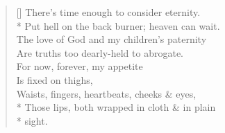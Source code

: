 \begin{verse}[\versewidth]
    There's time enough to consider eternity.\\*
    \vin Put hell on the back burner; heaven can wait.\\
    The love of God and my children's paternity\\
    \vin Are truths too dearly-held to abrogate.\\
    \vin \vin For now, forever, my appetite\\
    \vin \vin \vin Is fixed on thighs,\\
    \vin \vin \vin Waists, fingers, heartbeats, cheeks \& eyes,\\*
    \vin \vin Those lips, both wrapped in cloth \& in plain\\*
    \vin \vin \vin \vin sight.
\end{verse}
